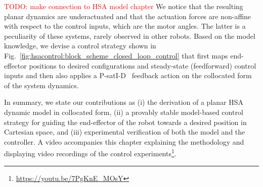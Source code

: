 \textcolor{red}{TODO: make connection to HSA model chapter}
We notice that the resulting planar dynamics are underactuated
and that the actuation forces are non-affine with respect to the control inputs, which are the motor angles. The latter is a peculiarity of these systems, rarely observed in other robots.
Based on the model knowledge, we devise a control strategy shown in Fig.~\ref{fig:hsacontrol:block_scheme_closed_loop_control} that first maps end-effector positions to desired configurations and steady-state (feedforward) control inputs and then 
also applies a P-satI-D~\cite{pustina2022p} feedback action on the collocated form~\cite{pustina2024input} of the system dynamics.

In summary, we state our contributions as (i) the derivation of a planar HSA dynamic model in collocated form, (ii) a provably stable model-based control strategy for guiding the end-effector of the robot towards a desired position in Cartesian space, and (iii) experimental verification of both the model and the controller. A video accompanies this chapter explaining the methodology and displaying video recordings of the control experiments\footnote{\url{https://youtu.be/7PgKnE_MOsY}}.


%
